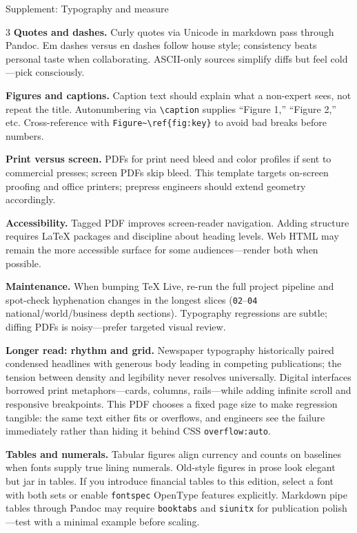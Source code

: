 \documentclass[
  ignorenonframetext,
]{beamer}
\begin{document}
\begin{frame}[fragile]{Supplement: Typography and measure}
\begin{multicols}{3}
\textbf{Quotes and dashes.} Curly quotes via Unicode in markdown pass
through Pandoc. Em dashes versus en dashes follow house style;
consistency beats personal taste when collaborating. ASCII-only sources
simplify diffs but feel cold---pick consciously.

\textbf{Figures and captions.} Caption text should explain what a
non-expert sees, not repeat the title. Autonumbering via
\texttt{\textbackslash{}caption} supplies ``Figure 1,'' ``Figure 2,''
etc. Cross-reference with
\texttt{Figure\textasciitilde{}\textbackslash{}ref\{fig:key\}} to avoid
bad breaks before numbers.

\textbf{Print versus screen.} PDFs for print need bleed and color
profiles if sent to commercial presses; screen PDFs skip bleed. This
template targets on-screen proofing and office printers; prepress
engineers should extend geometry accordingly.

\textbf{Accessibility.} Tagged PDF improves screen-reader navigation.
Adding structure requires LaTeX packages and discipline about heading
levels. Web HTML may remain the more accessible surface for some
audiences---render both when possible.

\textbf{Maintenance.} When bumping TeX Live, re-run the full project
pipeline and spot-check hyphenation changes in the longest slices
(\texttt{02}--\texttt{04} national/world/business depth sections).
Typography regressions are subtle; diffing PDFs is noisy---prefer
targeted visual review.

\textbf{Longer read: rhythm and grid.} Newspaper typography historically
paired condensed headlines with generous body leading in competing
publications; the tension between density and legibility never resolves
universally. Digital interfaces borrowed print metaphors---cards,
columns, rails---while adding infinite scroll and responsive
breakpoints. This PDF chooses a fixed page size to make regression
tangible: the same text either fits or overflows, and engineers see the
failure immediately rather than hiding it behind CSS
\texttt{overflow:auto}.

\textbf{Tables and numerals.} Tabular figures align currency and counts
on baselines when fonts supply true lining numerals. Old-style figures
in prose look elegant but jar in tables. If you introduce financial
tables to this edition, select a font with both sets or enable
\texttt{fontspec} OpenType features explicitly. Markdown pipe tables
through Pandoc may require \texttt{booktabs} and \texttt{siunitx} for
publication polish---test with a minimal example before scaling.


\end{multicols}
\end{frame}
\end{document}
